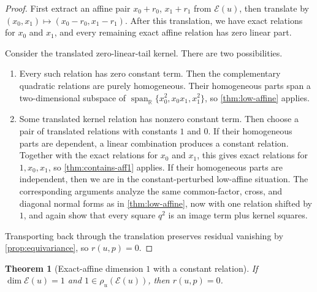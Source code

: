 \documentclass[10pt]{article}
\newtheorem{theorem}{Theorem}[section]
\theoremstyle{definition}
\newcommand{\R}{\mathbb{R}}
\newcommand{\HomQ}{\operatorname{span}_{\R}\{x_0^2,x_0x_1,x_1^2\}}
\newcommand{\rel}{\rho}
\newcommand{\Exact}{\mathcal{E}}
\begin{document}
\begin{proof}
First extract an affine pair \(x_0+r_0\), \(x_1+r_1\) from \(\Exact(u)\), then
translate by \((x_0,x_1)\mapsto (x_0-r_0,x_1-r_1)\). After this translation,
we have exact relations for \(x_0\) and \(x_1\), and every remaining exact
affine relation has zero linear part.

Consider the translated zero-linear-tail kernel. There are two possibilities.
\begin{enumerate}
\item Every such relation has zero constant term. Then the complementary
quadratic relations are purely homogeneous. Their homogeneous parts span a
two-dimensional subspace of \(\HomQ\), so \cref{thm:low-affine} applies.
\item Some translated kernel relation has nonzero constant term. Then choose a
pair of translated relations with constants \(1\) and \(0\). If their
homogeneous parts are dependent, a linear combination produces a constant
relation. Together with the exact relations for \(x_0\) and \(x_1\), this gives
exact relations for \(1,x_0,x_1\), so \cref{thm:contains-aff1} applies. If
their homogeneous parts are independent, then we are in the constant-perturbed
low-affine situation. The corresponding arguments analyze the same
common-factor, cross, and diagonal normal forms as in
\cref{thm:low-affine}, now with one relation shifted by \(1\), and again show
that every square \(q^2\) is an image term plus kernel squares.
\end{enumerate}
Transporting back through the translation preserves residual vanishing by
\cref{prop:equivariance}, so \(r(u,p)=0\).
\end{proof}

\begin{theorem}[Exact-affine dimension \(1\) with a constant relation]
\label{thm:exact-dim1-const}
If \(\dim \Exact(u)=1\) and \(1\in \rel_u(\Exact(u))\), then \(r(u,p)=0\).
\end{theorem}
\end{document}
